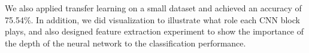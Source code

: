 We also applied transfer learning on a small dataset and achieved an accuracy of 75.54\%. In addition, we did visualization to illustrate what role each CNN block plays, and also designed feature extraction experiment to show the importance of the depth of the neural network to the classification performance.
